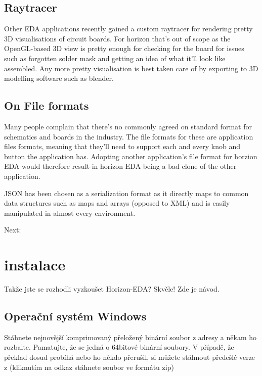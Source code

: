 \documentclass[letterpaper,10pt,czech]{sphinxmanual}
\begin{document}
\section{Raytracer}
\label{\detokenize{non-goals:raytracer}}
Other EDA applications recently gained a custom raytracer for rendering
pretty 3D visualisations of circuit boards. For horizon that’s out of
scope as the OpenGL-based 3D view is pretty enough for checking for the
board for issues such as forgotten solder mask and getting an idea of
what it’ll look like assembled. Any more pretty visualisation is best
taken care of by exporting to 3D modelling software such as blender.


\section{On File formats}
\label{\detokenize{non-goals:on-file-formats}}
Many people complain that there’s no commonly agreed on standard format
for schematics and boards in the industry. The file formats for these
are application files formats, meaning that they’ll need to support
each and every knob and button the application has. Adopting another
application’s file format for horzion EDA would therefore result in
horizon EDA being a bad clone of the other application.

JSON has been chosen as a serialization format as it directly maps to
common data structures such as maps and arrays (opposed to XML) and is
easily manipulated in almost every environment.

Next: {\hyperref[\detokenize{installation::doc}]{}}


\chapter{instalace}
\label{\detokenize{installation:instalace}}\label{\detokenize{installation::doc}}
Takže jste se rozhodli vyzkoušet Horizon-EDA? Skvěle! Zde je návod.


\section{Operační systém Windows}
\label{\detokenize{installation:operacni-system-windows}}
Stáhnete nejnovější komprimovaný přeložený binární soubor z adresy 
a někam ho rozbalte. Pamatujte, že se jedná o 64bitové binární soubory. V případě, že překlad dosud probíhá  nebo ho někdo přerušil, si můžete stáhnout předešlé verze z
(kliknutím na odkaz stáhnete soubor ve formátu zip)
\end{document}
